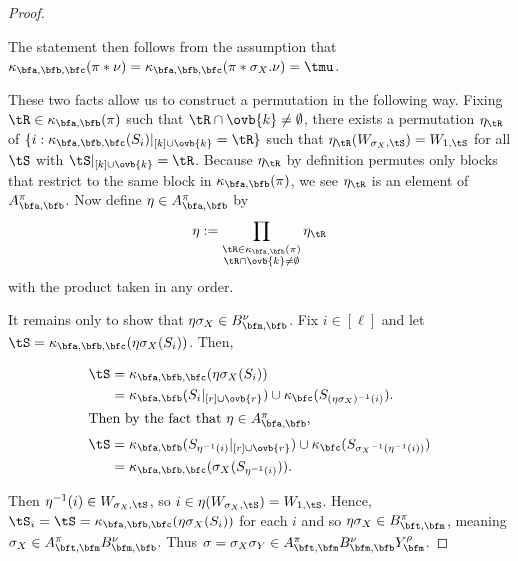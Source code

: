 \begin{proof}
\begin{enumerate}
The statement then follows from the assumption that $\kappa_{\bfa,\bfb,\bfc}(\pi\ast\nu)=\kappa_{\bfa,\bfb,\bfc}(\pi\ast \sigma_X.\nu)=\tmu$.
\end{enumerate}

These two facts allow us to construct a permutation in the following way. Fixing $\tR\in\kappa_{\bfa,\bfb}(\pi)$ such that $\tR\cap \ovb{k}\neq\emptyset$, there exists a permutation $\eta_{\tR}$ of $\{i:\kappa_{\bfa,\bfb,\bfc}(S_i)|_{[k]\cup\ovb{k}}=\tR\}$ such that $\eta_\tR(W_{\sigma_X,\tS})=W_{1,\tS}$ for all $\tS$ with $\tS|_{[k]\cup\ovb{k}}=\tR$. Because $\eta_\tR$ by definition permutes only blocks that restrict to the same block in $\kappa_{\bfa,\bfb}(\pi)$, we see $\eta_\tR$ is an element of $A_{\bfa,\bfb}^\pi$. Now define $\eta\in A_{\bfa,\bfb}^\pi$ by \begin{align*}
    \eta:=\prod_{\substack{\tR\in\kappa_{\bfa,\bfb}(\pi)\\\tR\cap\ovb{k}\neq\emptyset}}\eta_\tR
\end{align*} with the product taken in any order.

It remains only to show that $\eta\sigma_X\in B_{\bfm,\bfb}^\nu$. Fix $i\in[\ell]$ and let $\tS=\kappa_{\bfa,\bfb,\bfc}(\eta\sigma_X(S_i))$. Then,

\begin{align*}
    \tS&=\kappa_{\bfa,\bfb,\bfc}(\eta\sigma_X(S_i))\\
    &=\kappa_{\bfa,\bfb}(S_i|_{[r]\cup\ovb{r}})\cup\kappa_\bfc(S_{(\eta\sigma_X)^{-1}(i)}).\\
    \intertext{Then by the fact that $\eta\in A_{\bfa,\bfb}^\pi$,}
    \tS&=\kappa_{\bfa,\bfb}(S_{\eta^{-1}(i)}|_{[r]\cup\ovb{r}})\cup\kappa_\bfc(S_{{\sigma_X}^{-1}(\eta^{-1}(i))})\\
    &=\kappa_{\bfa,\bfb,\bfc}(\sigma_X(S_{\eta^{-1}(i)})).
\end{align*}

Then $\eta^{-1}(i)\in W_{\sigma_X,\tS}$, so $i\in \eta(W_{\sigma_X,\tS})=W_{1,\tS}$. Hence, $\tS_i=\tS=\kappa_{\bfa,\bfb,\bfc}(\eta\sigma_X(S_i))$ for each $i$ and so $\eta\sigma_X\in B^{\pi}_{\bft,\bfm}$, meaning $\sigma_X\in A_{\bft,\bfm}^\pi B_{\bfm,\bfb}^\nu$. Thus $\sigma=\sigma_X\sigma_Y\in A_{\bft,\bfm}^\pi B_{\bfm,\bfb}^\nu Y_\bfm^\rho$.
\end{proof}

